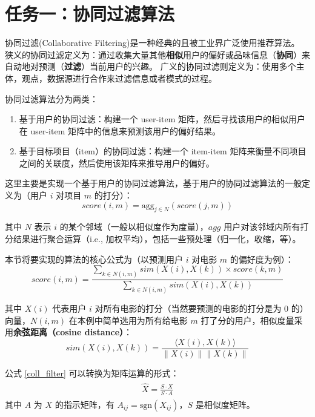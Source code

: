 \documentclass[degree=project, degree-type=project]{thuthesis}
\begin{document}
\chapter{任务一：协同过滤算法}

协同过滤(Collaborative Filtering)是一种经典的且被工业界广泛使用推荐算法。
狭义的协同过滤定义为：通过收集大量其他\textbf{相似}用户的偏好或品味信息（\textbf{协同}）来自动地对预测（\textbf{过滤}）当前用户的兴趣。
广义的协同过滤则定义为：使用多个主体，观点，数据源进行合作来过滤信息或者模式的过程。

协同过滤算法分为两类：

\begin{enumerate}
  \item 基于用户的协同过滤：构建一个 user-item 矩阵，然后寻找该用户的相似用户在 user-item 矩阵中的信息来预测该用户的偏好结果。
  \item 基于目标项目（item）的协同过滤：构建一个 item-item 矩阵来衡量不同项目之间的关联度，然后使用该矩阵来推导用户的偏好。
\end{enumerate}

这里主要是实现一个基于用户的协同过滤算法，基于用户的协同过滤算法的一般定义为（用户 $i$ 对项目 $m$ 的打分）：
\begin{equation}
  score(i, m) = \text{agg}_{j \in N}(score(j, m))
\end{equation}

其中 $N$ 表示 $i$ 的某个邻域（一般以相似度作为度量），$agg$ 用户对该邻域内所有打分结果进行聚合运算（i.e., 加权平均），包括一些预处理（归一化，收缩，等）。

本节将要实现的算法的核心公式为（以预测用户 $i$ 对电影 $m$ 的偏好度为例）：
\begin{equation}
score(i, m) = \frac{\sum_{k \in N(i, m)} sim(X(i), X(k)) \times score(k, m)}{\sum_{k \in N(i, m)} sim(X(i), X(k))}
  \label{coll_filter}
\end{equation}

其中 $X(i)$ 代表用户 $i$ 对所有电影的打分（当然要预测的电影的打分是为 0 的）向量，$N(i, m)$ 在本例中简单选用为所有给电影 $m$ 打了分的用户，相似度量采用\textbf{余弦距离（cosine distance）}：
\begin{equation}
sim(X(i), X(k)) = \frac{\langle X(i), X(k) \rangle}{\lVert X(i) \rVert \lVert X(k) \rVert}
\end{equation}

公式 \ref{coll_filter} 可以转换为矩阵运算的形式：
\begin{align}
  \begin{split}
    \hat{X} = \frac{S \cdot X}{S \cdot A}
  \end{split}
\end{align}
其中 $A$ 为 $X$ 的指示矩阵，有 $A_{ij} = \text{sgn}(X_{ij})$，$S$ 是相似度矩阵。
\end{document}
